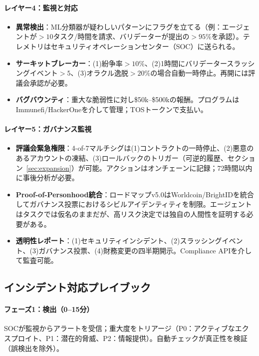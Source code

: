 \documentclass[11pt]{article}
\begin{document}
\paragraph{レイヤー4：監視と対応}
\begin{itemize}[noitemsep]
  \item \textbf{異常検出}：ML分類器が疑わしいパターンにフラグを立てる（例：エージェントが$>10$タスク/時間を請求、バリデーターが提出の$>95\%$を承認）。テレメトリはセキュリティオペレーションセンター（SOC）に送られる。
  \item \textbf{サーキットブレーカー}：(1)紛争率$>10\%$、(2)1時間にバリデータースラッシングイベント$>5$、(3)オラクル逸脱$>20\%$の場合自動一時停止。再開には評議会承認が必要。
  \item \textbf{バグバウンティ}：重大な脆弱性に対し\$50k--\$500kの報酬。プログラムはImmunefi/HackerOneを介して管理；TOSトークンで支払い。
\end{itemize}

\paragraph{レイヤー5：ガバナンス監視}
\begin{itemize}[noitemsep]
  \item \textbf{評議会緊急権限}：4-of-7マルチシグは(1)コントラクトの一時停止、(2)悪意のあるアカウントの凍結、(3)ロールバックのトリガー（可逆的履歴、セクション~\ref{sec:expansion}）が可能。アクションはオンチェーンに記録；72時間以内に事後分析が必要。
  \item \textbf{Proof-of-Personhood統合}：ロードマップv5.0はWorldcoin/BrightIDを統合してガバナンス投票におけるシビルアイデンティティを制限。エージェントはタスクでは仮名のままだが、高リスク決定では独自の人間性を証明する必要がある。
  \item \textbf{透明性レポート}：(1)セキュリティインシデント、(2)スラッシングイベント、(3)ガバナンス投票、(4)財務変更の四半期開示。Compliance APIを介して監査可能。
\end{itemize}

\subsection{インシデント対応プレイブック}

\paragraph{フェーズ1：検出（0--15分）}
SOCが監視からアラートを受信；重大度をトリアージ（P0：アクティブなエクスプロイト、P1：潜在的脅威、P2：情報提供）。自動チェックが真正性を検証（誤検出を除外）。
\end{document}

